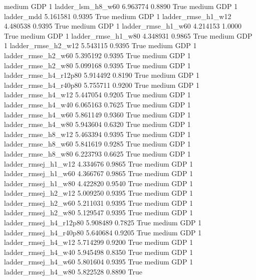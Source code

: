     medium      GDP                 1      ladder_lsm_h8_w60   6.963774      0.8890    True
    medium      GDP                 1             ladder_mdd   5.161581      0.9395    True
    medium      GDP                 1     ladder_rmse_h1_w12   4.480538      0.9395    True
    medium      GDP                 1     ladder_rmse_h1_w60   4.214153      1.0000    True
    medium      GDP                 1     ladder_rmse_h1_w80   4.348931      0.9865    True
    medium      GDP                 1     ladder_rmse_h2_w12   5.543115      0.9395    True
    medium      GDP                 1     ladder_rmse_h2_w60   5.395192      0.9395    True
    medium      GDP                 1     ladder_rmse_h2_w80   5.099168      0.9395    True
    medium      GDP                 1  ladder_rmse_h4_r12p80   5.914492      0.8190    True
    medium      GDP                 1  ladder_rmse_h4_r40p80   5.755711      0.9200    True
    medium      GDP                 1     ladder_rmse_h4_w12   5.447054      0.9205    True
    medium      GDP                 1     ladder_rmse_h4_w40   6.065163      0.7625    True
    medium      GDP                 1     ladder_rmse_h4_w60   5.861149      0.9360    True
    medium      GDP                 1     ladder_rmse_h4_w80   5.943604      0.6320    True
    medium      GDP                 1     ladder_rmse_h8_w12   5.463394      0.9395    True
    medium      GDP                 1     ladder_rmse_h8_w60   5.841619      0.9285    True
    medium      GDP                 1     ladder_rmse_h8_w80   6.223793      0.6625    True
    medium      GDP                 1    ladder_rmsej_h1_w12   4.334676      0.9865    True
    medium      GDP                 1    ladder_rmsej_h1_w60   4.366767      0.9865    True
    medium      GDP                 1    ladder_rmsej_h1_w80   4.422820      0.9540    True
    medium      GDP                 1    ladder_rmsej_h2_w12   5.009250      0.9395    True
    medium      GDP                 1    ladder_rmsej_h2_w60   5.211031      0.9395    True
    medium      GDP                 1    ladder_rmsej_h2_w80   5.129547      0.9395    True
    medium      GDP                 1 ladder_rmsej_h4_r12p80   5.908489      0.7825    True
    medium      GDP                 1 ladder_rmsej_h4_r40p80   5.640684      0.9205    True
    medium      GDP                 1    ladder_rmsej_h4_w12   5.714299      0.9200    True
    medium      GDP                 1    ladder_rmsej_h4_w40   5.945498      0.8350    True
    medium      GDP                 1    ladder_rmsej_h4_w60   5.801604      0.9395    True
    medium      GDP                 1    ladder_rmsej_h4_w80   5.822528      0.8890    True
